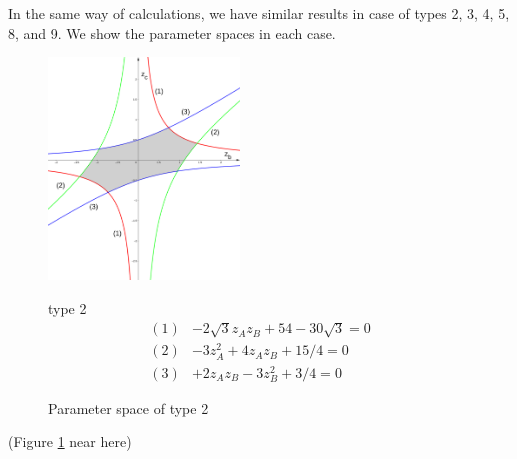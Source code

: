 \documentclass[suppldata, dvipdfmx]{interact}
\theoremstyle{plain}%
\theoremstyle{definition}
\theoremstyle{remark}
\theoremstyle{problemstyle}
\begin{document}
In the same way of calculations, we have similar results in case of types 2, 3, 4, 5, 8, and 9.  We show the parameter spaces in each case.

\begin{figure}[h!tbp]
 \begin{minipage}[]{0.5\textwidth}
 \centering
 \includegraphics[width=2in,
 keepaspectratio]{./img/graph/cubeB.jpg}
 \caption{Parameter space of type 2}
 \label{fig:graphCubeB}
 \end{minipage}
 \hspace*{\fill}
 \begin{minipage}[]{0.5\textwidth}
  type 2
  \centering
  \begin{align*}
   (1)& -2\sqrt{3} z_A z_B + 54 - 30\sqrt{3} = 0\\
   (2)& -3z_A^2 + 4 z_A z_B + 15/4 = 0\\
   (3)& +2z_A z_B - 3z_B^2 + 3/4 = 0
  \end{align*}
 \end{minipage}
\end{figure}

\noindent(Figure \ref{fig:graphCubeB} near here)
\end{document}
